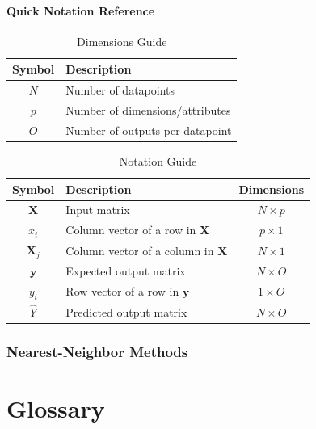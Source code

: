 \documentclass[a4paper,10pt,english]{book}
\begin{document}
\subsubsection{Quick Notation Reference}

\begin{table}[H]
\caption{Dimensions Guide\label{table_0}}
\centering
\begin{tabular}{| c l|}
\hline
\textbf{Symbol} & \textbf{Description} \\
\hline
$N$ & Number of datapoints \\
$p$ & Number of dimensions/attributes \\
$O$ & Number of outputs per datapoint \\
\hline
\end{tabular}
\end{table}

\begin{table}[H]
\caption{Notation Guide\label{table_1}}
\centering
\begin{tabular}{| c l c |}
\hline
\textbf{Symbol} & \textbf{Description} & \textbf{Dimensions} \\
\hline
$\mathbf{X}$ & Input matrix & $N \times p$ \\
$x_i$ & Column vector of a row in $\mathbf{X}$ & $p \times 1$ \\
$\mathbf{X}_j$ & Column vector of a column in $\mathbf{X}$ & $N \times 1$ \\
$\mathbf{y}$ & Expected output matrix & $N \times O$ \\
$y_i$ & Row vector of a row in $\mathbf{y}$ & $1 \times O$ \\
$\hat{Y}$ & Predicted output matrix & $N \times O$ \\
\hline
\end{tabular}
\end{table}

\subsection{Nearest-Neighbor Methods}



\chapter{Glossary}
\end{document}
